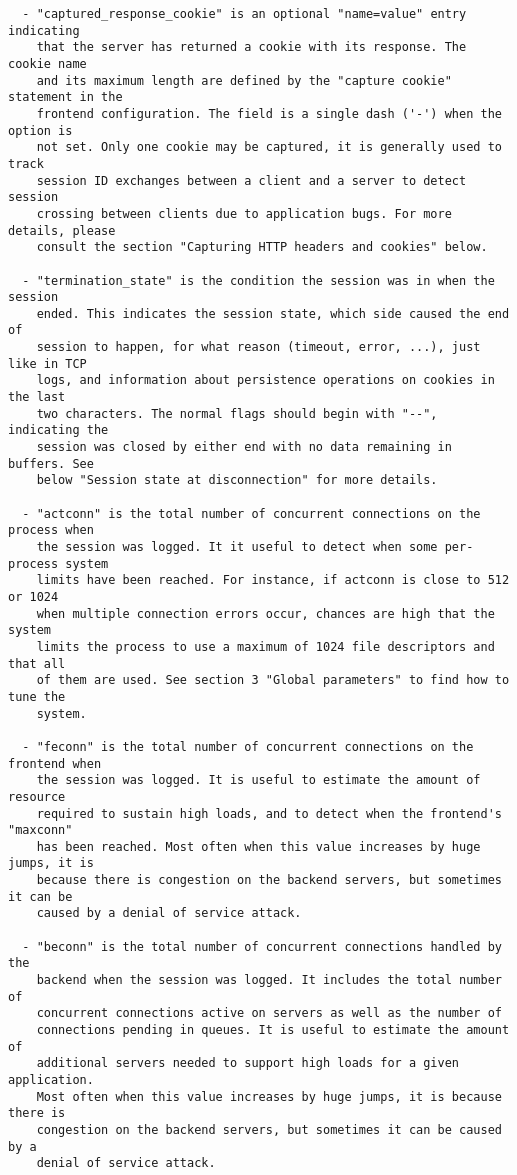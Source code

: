 \begin{verbatim}
  - "captured_response_cookie" is an optional "name=value" entry indicating
    that the server has returned a cookie with its response. The cookie name
    and its maximum length are defined by the "capture cookie" statement in the
    frontend configuration. The field is a single dash ('-') when the option is
    not set. Only one cookie may be captured, it is generally used to track
    session ID exchanges between a client and a server to detect session
    crossing between clients due to application bugs. For more details, please
    consult the section "Capturing HTTP headers and cookies" below.

  - "termination_state" is the condition the session was in when the session
    ended. This indicates the session state, which side caused the end of
    session to happen, for what reason (timeout, error, ...), just like in TCP
    logs, and information about persistence operations on cookies in the last
    two characters. The normal flags should begin with "--", indicating the
    session was closed by either end with no data remaining in buffers. See
    below "Session state at disconnection" for more details.

  - "actconn" is the total number of concurrent connections on the process when
    the session was logged. It it useful to detect when some per-process system
    limits have been reached. For instance, if actconn is close to 512 or 1024
    when multiple connection errors occur, chances are high that the system
    limits the process to use a maximum of 1024 file descriptors and that all
    of them are used. See section 3 "Global parameters" to find how to tune the
    system.

  - "feconn" is the total number of concurrent connections on the frontend when
    the session was logged. It is useful to estimate the amount of resource
    required to sustain high loads, and to detect when the frontend's "maxconn"
    has been reached. Most often when this value increases by huge jumps, it is
    because there is congestion on the backend servers, but sometimes it can be
    caused by a denial of service attack.

  - "beconn" is the total number of concurrent connections handled by the
    backend when the session was logged. It includes the total number of
    concurrent connections active on servers as well as the number of
    connections pending in queues. It is useful to estimate the amount of
    additional servers needed to support high loads for a given application.
    Most often when this value increases by huge jumps, it is because there is
    congestion on the backend servers, but sometimes it can be caused by a
    denial of service attack.


\end{verbatim}
